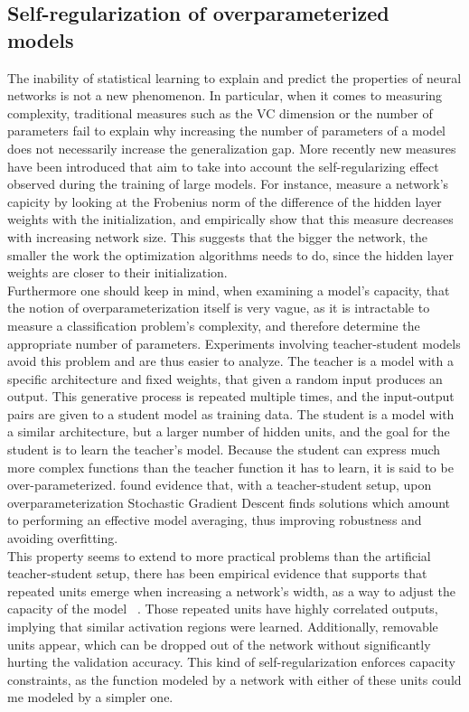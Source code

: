 \subsection{Self-regularization of overparameterized models}
The inability of statistical learning to explain and predict the properties of neural networks is not a new phenomenon. In particular, when it comes to measuring complexity, traditional measures such as the VC dimension or the number of parameters fail to explain why increasing the number of parameters of a model does not necessarily increase the generalization gap. More recently new measures have been introduced that aim to take into account the self-regularizing effect observed during the training of large models. For instance, \cite{neyshabur2018towards} 
 measure a network's capicity by looking at the Frobenius norm of the difference of the hidden layer weights with the initialization, and empirically show that this measure decreases with increasing network size. This suggests that the bigger the network, the smaller the work the optimization algorithms needs to do, since the hidden layer weights are closer to their initialization. \\

Furthermore one should keep in mind, when examining a model's capacity, that the notion of overparameterization itself is very vague, as it is intractable to measure a classification problem's complexity, and therefore determine the appropriate number of parameters. Experiments involving teacher-student models avoid this problem and are thus easier to analyze. The teacher is a model with a specific architecture and fixed weights, that given a random input produces an output. This generative process is repeated multiple times, and the input-output pairs are given to a student model as training data. The student is a model with a similar architecture, but a larger number of hidden units, and the goal for the student is to learn the teacher's model. Because the student can express much more complex functions than the teacher function it has to learn, it is said to be over-parameterized. \cite{goldt2019dynamics} found evidence that, with a teacher-student setup, upon overparameterization Stochastic Gradient Descent finds solutions which amount to performing an effective model averaging, thus improving robustness and avoiding overfitting. \\

This property seems to extend to more practical problems than the artificial teacher-student setup, there has been empirical evidence that supports that repeated units emerge when increasing a network's width, as a way to adjust the capacity of the model ~\autocite{casper2019removable}. Those repeated units have highly correlated outputs, implying that similar activation regions were learned. Additionally, removable units appear, which can be dropped out of the network without significantly hurting the validation accuracy. This kind of self-regularization enforces capacity constraints, as the function modeled by a network with either of these units could me modeled by a simpler one. \\
 
